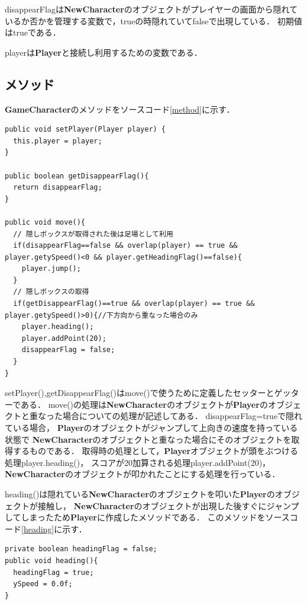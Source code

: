 \documentclass[titlepage,dvipdfmx]{jarticle}
\newcommand{\className}{\textbf}%
\begin{document}
disappearFlagは\className{NewCharacter}のオブジェクトがプレイヤーの画面から隠れているか否かを管理する変数で，trueの時隠れていてfalseで出現している．
初期値はtrueである．

playerは\className{Player}と接続し利用するための変数である．

\subsection*{メソッド}
\className{GameCharacter}のメソッドをソースコード\ref{method}に示す．
\begin{lstlisting}[caption=メソッド,label=method]
public void setPlayer(Player player) {
  this.player = player;
}

public boolean getDisappearFlag(){
  return disappearFlag;
}

public void move(){
  // 隠しボックスが取得された後は足場として利用
  if(disappearFlag==false && overlap(player) == true && player.getySpeed()<0 && player.getHeadingFlag()==false){
    player.jump();
  }
  // 隠しボックスの取得
  if(getDisappearFlag()==true && overlap(player) == true && player.getySpeed()>0){//下方向から重なった場合のみ
    player.heading();
    player.addPoint(20);
    disappearFlag = false;
  }
}
\end{lstlisting}
setPlayer(),getDisappearFlag()はmove()で使うために定義したセッターとゲッターである．
move()の処理は\className{NewCharacter}のオブジェクトが\className{Player}のオブジェクトと重なった場合についての処理が記述してある．
disappearFlag=trueで隠れている場合，
\className{Player}のオブジェクトがジャンプして上向きの速度を持っている状態で
\className{NewCharacter}のオブジェクトと重なった場合にそのオブジェクトを取得するものである．
取得時の処理として，\className{Player}オブジェクトが頭をぶつける処理player.heading()，
スコアが20加算される処理player.addPoint(20)，
\className{NewCharacter}のオブジェクトが叩かれたことにする処理を行っている．

heading()は隠れている\className{NewCharacter}のオブジェクトを叩いた\className{Player}のオブジェクトが接触し，
\className{NewCharacter}のオブジェクトが出現した後すぐにジャンプしてしまったため\className{Player}に作成したメソッドである．
このメソッドをソースコード\ref{heading}に示す．
\begin{lstlisting}[caption=heading(),label=heading]
private boolean headingFlag = false;
public void heading(){
  headingFlag = true;
  ySpeed = 0.0f;
}
\end{lstlisting}
\end{document}
